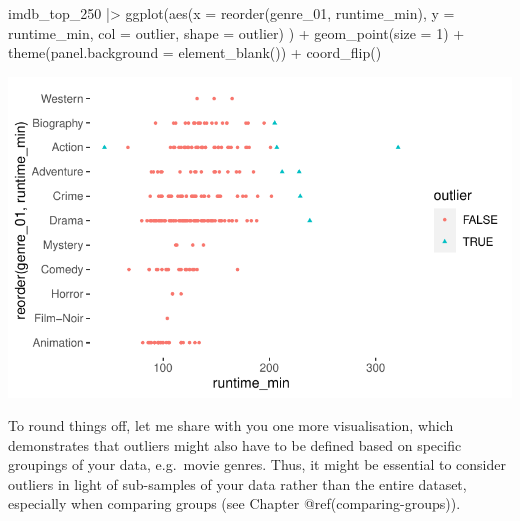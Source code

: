\documentclass[
  letterpaper,
]{krantz}
\makeatletter
\newenvironment{Shaded}{\begin{snugshade}}{\end{snugshade}}
\newcommand{\AttributeTok}[1]{\textcolor[rgb]{0.40,0.45,0.13}{#1}}
\newcommand{\DecValTok}[1]{\textcolor[rgb]{0.68,0.00,0.00}{#1}}
\newcommand{\FunctionTok}[1]{\textcolor[rgb]{0.28,0.35,0.67}{#1}}
\newcommand{\NormalTok}[1]{\textcolor[rgb]{0.00,0.23,0.31}{#1}}
\newcommand{\SpecialCharTok}[1]{\textcolor[rgb]{0.37,0.37,0.37}{#1}}
\newenvironment{kframe}{%
\medskip{}
\setlength{\fboxsep}{.8em}
 \def\at@end@of@kframe{}%
 \ifinner\ifhmode%
  \def\at@end@of@kframe{\end{minipage}}%
  \begin{minipage}{\columnwidth}%
 \fi\fi%
 \def\FrameCommand##1{\hskip\@totalleftmargin \hskip-\fboxsep
 \colorbox{shadecolor}{##1}\hskip-\fboxsep
     \hskip-\linewidth \hskip-\@totalleftmargin \hskip\columnwidth}%
 \MakeFramed {\advance\hsize-\width
   \@totalleftmargin\z@ \linewidth\hsize
   \@setminipage}}%
 {\par\unskip\endMakeFramed%
 \at@end@of@kframe}
\renewenvironment{Shaded}{\begin{kframe}}{\end{kframe}}
\makeatother
\begin{document}
\begin{Shaded}
\begin{Highlighting}[]
\NormalTok{imdb\_top\_250 }\SpecialCharTok{|\textgreater{}}
  \FunctionTok{ggplot}\NormalTok{(}\FunctionTok{aes}\NormalTok{(}\AttributeTok{x =} \FunctionTok{reorder}\NormalTok{(genre\_01, runtime\_min),}
             \AttributeTok{y =}\NormalTok{ runtime\_min,}
             \AttributeTok{col =}\NormalTok{ outlier,}
             \AttributeTok{shape =}\NormalTok{ outlier)}
\NormalTok{         ) }\SpecialCharTok{+}
  \FunctionTok{geom\_point}\NormalTok{(}\AttributeTok{size =} \DecValTok{1}\NormalTok{) }\SpecialCharTok{+}
  \FunctionTok{theme}\NormalTok{(}\AttributeTok{panel.background =} \FunctionTok{element\_blank}\NormalTok{()) }\SpecialCharTok{+}
  \FunctionTok{coord\_flip}\NormalTok{()}
\end{Highlighting}
\end{Shaded}

\includegraphics{09_sources_of_bias_files/figure-pdf/plot-outliers-different-format-1.pdf}

To round things off, let me share with you one more visualisation, which
demonstrates that outliers might also have to be defined based on
specific groupings of your data, e.g.~movie genres. Thus, it might be
essential to consider outliers in light of sub-samples of your data
rather than the entire dataset, especially when comparing groups (see
Chapter @ref(comparing-groups)).
\end{document}
